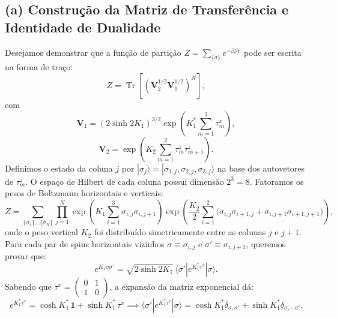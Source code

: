 \documentclass[11pt,a4paper]{article}
\begin{document}
\subsection*{(a) Construção da Matriz de Transferência e Identidade de Dualidade}
%
Desejamos demonstrar que a função de partição $Z = \sum_{\{\sigma\}} e^{-\beta \mathcal{H}}$ pode ser escrita na forma de traço:
%
\begin{equation}
    Z = \operatorname{Tr}\left[ \left(\mathbf{V}_2^{1/2} \mathbf{V}_1^{1/2}\right)^N \right],
\end{equation}
%
com
%
\begin{equation}
    \mathbf{V}_1 = (2\sinh 2K_1)^{3/2} \exp\left( K_1^* \sum_{m=1}^{3} \tau_m^x \right),
\end{equation}
%
\begin{equation}
    \mathbf{V}_2 = \exp\left( K_2 \sum_{m=1}^{2} \tau_m^z \tau_{m+1}^z \right).
\end{equation}
%
Definimos o estado da coluna $j$ por $|\sigma_j\rangle = |\sigma_{1,j}, \sigma_{2,j}, \sigma_{3,j}\rangle$ na base dos autovetores de $\tau_m^z$. O espaço de Hilbert de cada coluna possui dimensão $2^3 = 8$. Fatoramos os pesos de Boltzmann horizontais e verticais:
%
\begin{equation}
    Z = \sum_{\{\sigma_1\}\dots\{\sigma_N\}} \prod_{j=1}^N \exp\left( K_1 \sum_{i=1}^3 \sigma_{i,j}\sigma_{i,j+1} \right) \exp\left( \frac{K_2}{2}\sum_{i=1}^2 \bigl(\sigma_{i,j}\sigma_{i+1,j} + \sigma_{i,j+1}\sigma_{i+1,j+1}\bigr) \right),
\end{equation}
%
onde o peso vertical $K_2$ foi distribuído simetricamente entre as colunas $j$ e $j+1$. Para cada par de spins horizontais vizinhos $\sigma \equiv \sigma_{i,j}$ e $\sigma' \equiv \sigma_{i,j+1}$, queremos provar que:
%
\begin{equation}
    e^{K_1 \sigma \sigma'} = \sqrt{2\sinh 2K_1} \, \langle \sigma' | e^{K_1^* \tau^x} | \sigma \rangle.
    \label{eq:dual_id_proof}
\end{equation}
%
Sabendo que $\tau^x = \begin{pmatrix} 0 & 1 \\ 1 & 0 \end{pmatrix}$, a expansão da matriz exponencial dá:
%
\begin{equation}
    e^{K_1^* \tau^x} = \cosh K_1^* \, \mathbb{1} + \sinh K_1^* \, \tau^x \implies \langle \sigma' | e^{K_1^* \tau^x} | \sigma \rangle = \cosh K_1^* \delta_{\sigma,\sigma'} + \sinh K_1^* \delta_{\sigma,-\sigma'}.
\end{equation}
\end{document}
